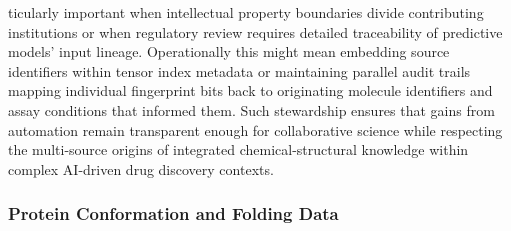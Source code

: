 \documentclass[
]{article}
\begin{document}
ticularly important when intellectual property boundaries divide
contributing institutions or when regulatory review requires detailed
traceability of predictive models' input lineage. Operationally this
might mean embedding source identifiers within tensor index metadata or
maintaining parallel audit trails mapping individual fingerprint bits
back to originating molecule identifiers and assay conditions that
informed them. Such stewardship ensures that gains from automation
remain transparent enough for collaborative science while respecting the
multi-source origins of integrated chemical-structural knowledge within
complex AI-driven drug discovery contexts.

\subsubsection{Protein Conformation and Folding
Data}\label{protein-conformation-and-folding-data}
\end{document}
